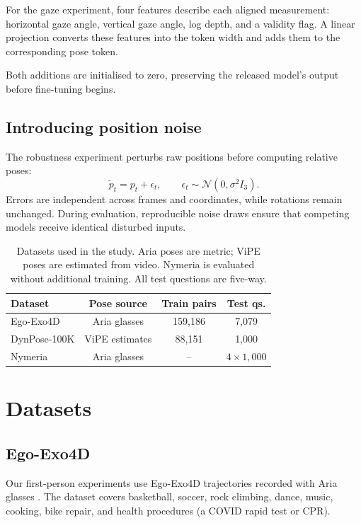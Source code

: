 \documentclass[10pt,twocolumn,letterpaper]{article}
\begin{document}
For the gaze experiment, four features describe each aligned measurement: horizontal gaze angle, vertical gaze
angle, log depth, and a validity flag. A linear projection converts these features into the token width and adds
them to the corresponding pose token.

Both additions are initialised to zero, preserving the released model's output before fine-tuning begins.

\subsection{Introducing position noise}
The robustness experiment perturbs raw positions before computing relative poses:
\begin{equation}
\tilde{p}_t = p_t + \epsilon_t, \qquad \epsilon_t\sim\mathcal{N}(0,\sigma^2 I_3).
\end{equation}
Errors are independent across frames and coordinates, while rotations remain unchanged. During evaluation,
reproducible noise draws ensure that competing models receive identical disturbed inputs.

\begin{table}[t]
\centering\small
\setlength{\tabcolsep}{3pt}
\begin{tabular}{lccc}
\toprule
Dataset & Pose source & Train pairs & Test qs. \\
\midrule
Ego-Exo4D & Aria glasses & 159,186 & 7,079 \\
DynPose-100K & ViPE estimates & 88,151 & 1,000 \\
Nymeria & Aria glasses & -- & $4\times1{,}000$ \\
\bottomrule
\end{tabular}
\caption{Datasets used in the study. Aria poses are metric; ViPE poses are estimated from video. Nymeria is
evaluated without additional training. All test questions are five-way.}
\label{tab:data}
\end{table}

\section{Datasets}
\label{sec:data}

\subsection{Ego-Exo4D}
Our first-person experiments use Ego-Exo4D trajectories recorded with Aria glasses
\cite{engel2023aria,grauman2024egoexo4d}. The dataset covers basketball, soccer, rock climbing, dance, music,
cooking, bike repair, and health procedures (a COVID rapid test or CPR).
\end{document}
